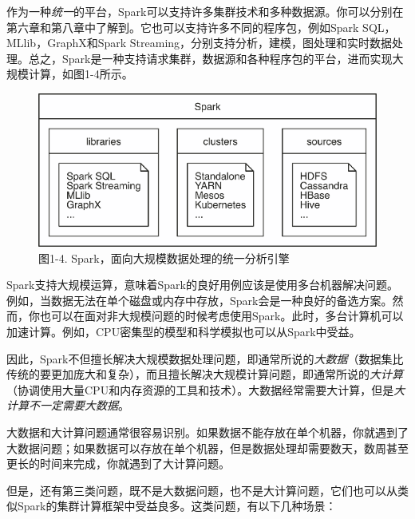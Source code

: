 \documentclass[
]{article}
\begin{document}
作为一种\emph{统一}的平台，Spark可以支持许多集群技术和多种数据源。你可以分别在第六章和第八章中了解到。它也可以支持许多不同的程序包，例如Spark
SQL，MLlib，GraphX和Spark
Streaming，分别支持分析，建模，图处理和实时数据处理。总之，Spark是一种支持请求集群，数据源和各种程序包的平台，进而实现大规模计算，如图1-4所示。

\begin{figure}
\centering
\includegraphics{figures/1_4.png}
\caption{图1-4. Spark，面向大规模数据处理的统一分析引擎}
\end{figure}

Spark支持大规模运算，意味着Spark的良好用例应该是使用多台机器解决问题。例如，当数据无法在单个磁盘或内存中存放，Spark会是一种良好的备选方案。然而，你也可以在面对非大规模问题的时候考虑使用Spark。此时，多台计算机可以加速计算。例如，CPU密集型的模型和科学模拟也可以从Spark中受益。

因此，Spark不但擅长解决大规模数据处理问题，即通常所说的\emph{大数据}（数据集比传统的要更加庞大和复杂），而且擅长解决大规模计算问题，即通常所说的\emph{大计算}（协调使用大量CPU和内存资源的工具和技术）。大数据经常需要大计算，但是\emph{大计算不一定需要大数据}。

大数据和大计算问题通常很容易识别。如果数据不能存放在单个机器，你就遇到了大数据问题；如果数据可以存放在单个机器，但是数据处理却需要数天，数周甚至更长的时间来完成，你就遇到了大计算问题。

但是，还有第三类问题，既不是大数据问题，也不是大计算问题，它们也可以从类似Spark的集群计算框架中受益良多。这类问题，有以下几种场景：
\end{document}
